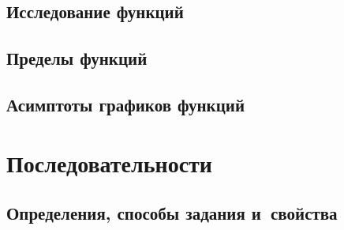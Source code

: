 \documentclass[]{scrartcl}
\begin{document}
\subsection{Исследование функций}
\subsection{Пределы функций}
\subsection{Асимптоты графиков функций}

\section{Последовательности}
\subsection{Определения, способы задания и~свойства}
\end{document}
